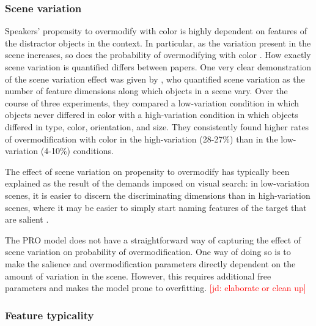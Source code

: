 \documentclass[11pt]{article}
\newcommand{\jd}[1]{\textcolor{Red}{[jd: #1]}}
\begin{document}
\subsubsection{Scene variation}
\label{sec:scenevariation}

Speakers' propensity to overmodify with color is highly dependent on features of the distractor objects in the context. In particular, as the variation present in the scene increases, so does the probability of overmodifying with color \cite{Davies2013, Koolen2013}. How exactly scene variation is quantified differs between papers. One very clear demonstration of the scene variation effect was given by , who quantified scene variation as the number of feature dimensions along which objects in a scene vary. Over the course of three experiments, they compared a low-variation condition in which objects never differed in color with a high-variation condition in which objects differed in type, color, orientation, and size. They consistently found higher rates of overmodification with color in the high-variation (28-27\%) than in the low-variation (4-10\%) conditions.

The effect of scene variation on propensity to overmodify has typically been explained as the result of the demands imposed on visual search: in low-variation scenes, it is easier to discern the discriminating dimensions than in high-variation scenes, where it may be easier to simply start naming features of the target that are salient \cite{Koolen2013}. 

The PRO model does not have a straightforward way of capturing the effect of scene variation on probability of overmodification. One way of doing so is to make the salience and overmodification parameters directly dependent on the amount of variation in the scene. However, this requires additional free parameters and makes the model prone to overfitting. \jd{elaborate or clean up}

\subsubsection{Feature typicality}
\label{sec:colortypicality}
\end{document}
